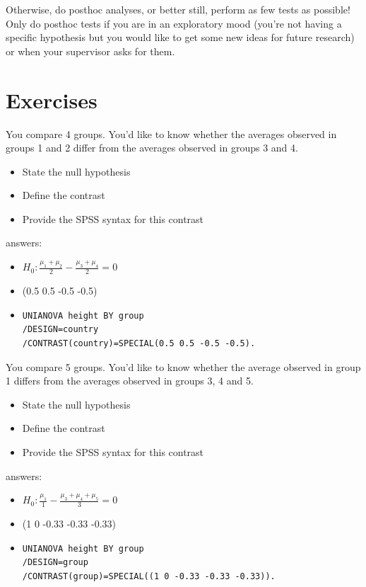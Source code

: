 \documentclass[]{book}\usepackage[]{graphicx}\usepackage[]{color}
\begin{document}
Otherwise, do posthoc analyses, or better still, perform as few tests as possible! Only do posthoc tests if you are in an exploratory mood (you're not having a specific hypothesis but you would like to get some new ideas for future research) or when your supervisor asks for them.





\section{Exercises}

You compare 4 groups. You'd like to know whether the averages observed in groups 1 and 2 differ from the averages observed in groups 3 and 4. 

\begin{itemize}
\item State the null hypothesis
\item Define the contrast
\item Provide the SPSS syntax for this contrast
\end{itemize}

answers: 
\begin{itemize}
\item $H_0: \frac{\mu_1 + \mu_2}{2} - \frac{\mu_3 + \mu_4}{2} = 0  $
\item (0.5 0.5 -0.5 -0.5)
\item \begin{verbatim}
UNIANOVA height BY group
/DESIGN=country
/CONTRAST(country)=SPECIAL(0.5 0.5 -0.5 -0.5).
\end{verbatim}
\end{itemize}




You compare 5 groups. You'd like to know whether the average observed in group 1 differs from the averages observed in groups 3, 4 and 5. 

\begin{itemize}
\item State the null hypothesis
\item Define the contrast
\item Provide the SPSS syntax for this contrast
\end{itemize}

answers: 
\begin{itemize}
\item $H_0: \frac{\mu_1}{1} - \frac{\mu_3 + \mu_4 + \mu_5}{3} = 0  $
\item (1 0 -0.33 -0.33 -0.33)
\item \begin{verbatim}
UNIANOVA height BY group
/DESIGN=group
/CONTRAST(group)=SPECIAL((1 0 -0.33 -0.33 -0.33)).
\end{verbatim}
\end{itemize}
\end{document}
